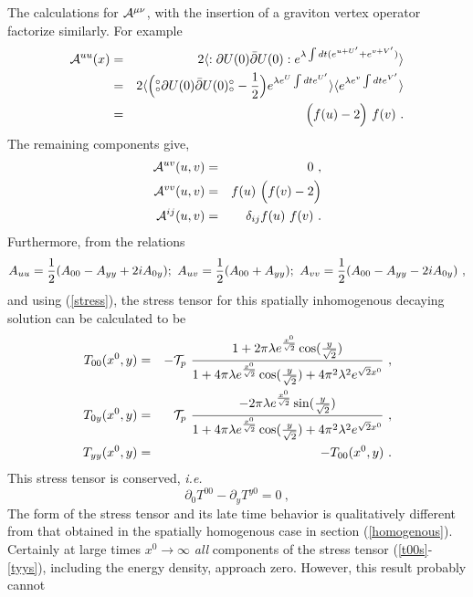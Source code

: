 \documentclass[a4paper,12pt]{article}
\def\p{\partial}
\def\pb{\bar{\partial}}
\def\no{{}^\circ \hspace{-0.16cm} {}_{\circ}}
\begin{document}
The calculations for ${\cal A}^{\mu \nu}$, with the insertion of a 
graviton vertex operator factorize similarly. For example
\begin{eqnarray}
{\cal A}^{u u}(x) &=& 2 \langle :\p U(0) \pb U(0): e^{\lambda \int dt (e^{u+U'}+e^{v+V'})} \rangle  
   \nonumber \\
& = &2\langle  \Bigl( \no \p U(0) \pb U(0)  \no  -{1 \over 2} \Bigr)e^{\lambda e^{U} \int dt e^{U'}}\rangle \langle e^{\lambda e^{v} \int dt e^{V'}}\rangle   \nonumber  \\
&=& \Bigl(f(u)-2\Bigr)~f(v)~.
\end{eqnarray}
The remaining components give, 
\begin{eqnarray*}
{\cal A}^{uv}(u,v)& = & 0~, \\
{\cal A}^{vv}(u,v)& = & f(u)~\Bigl(f(v)-2 \Bigr)\\
{\cal A}^{ij}(u,v)& = & \delta_{ij} f(u)~f(v)~.
\end{eqnarray*}
Furthermore, from the relations
\begin{equation}
A_{uu}={1\over 2}(A_{00}-A_{yy}+2i A_{0y}); ~
A_{uv}={1\over 2}(A_{00}+A_{yy});~
A_{vv}={1\over 2}(A_{00}-A_{yy}-2i A_{0y})~,
\end{equation}
and
using (\ref{stress}), the stress tensor for this spatially inhomogenous decaying solution can be calculated to be
\begin{eqnarray}
T_{00}(x^0,y)& = &- {\cal T}_p   ~\frac{{1+2 \pi \lambda e^{x^0 \over \sqrt{2}} \cos({y \over \sqrt{2}})}}
{{1+4\pi \lambda e^{x^0 \over \sqrt{2}}\cos({y \over \sqrt{2}})+4 \pi^2 \lambda^2 e^{\sqrt{2}x^0}}}~,
\label{t00s} \\
T_{0y}(x^0,y)& = & {\cal T}_p  ~\frac{{-2 \pi \lambda e^{x^0 \over \sqrt{2}} \sin({y \over \sqrt{2}})}}
{{1+4\pi \lambda e^{x^0 \over \sqrt{2}}\cos({y \over \sqrt{2}})+
4 \pi^2 \lambda^2 e^{\sqrt{2}x^0}}}~,\\
T_{yy}(x^0,y)&=&-T_{00}(x^0,y) ~.\label{tyys}
\end{eqnarray}
This stress tensor is conserved, {\em i.e.}
\begin{equation}
\p_0T^{00}-\p_yT^{y0}=0~,
\end{equation}
The form of the stress tensor and its late time behavior  is qualitatively different from that obtained in the spatially homogenous case in section (\ref{homogenous}). Certainly at large times 
$x^0 \rightarrow \infty$ {\it all} components of the stress tensor (\ref{t00s}-\ref{tyys}), 
including the energy density, approach zero. However,  this result probably cannot
\end{document}
